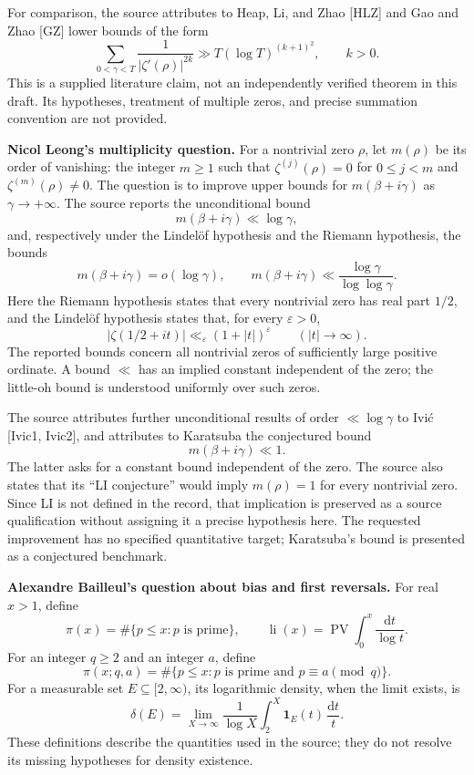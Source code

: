 \documentclass[11pt]{article}
\begin{document}
For comparison, the source attributes to Heap, Li, and Zhao [HLZ] and Gao and Zhao [GZ] lower bounds of the form
\[
\sum_{0<\gamma<T}\frac{1}{|\zeta'(\rho)|^{2k}}
\gg T(\log T)^{(k+1)^2},\qquad k>0.
\]
This is a supplied literature claim, not an independently verified theorem in this draft. Its hypotheses, treatment of multiple zeros, and precise summation convention are not provided.

\textbf{Nicol Leong's multiplicity question.}
For a nontrivial zero \(\rho\), let \(m(\rho)\) be its order of vanishing: the integer \(m\geq1\) such that \(\zeta^{(j)}(\rho)=0\) for \(0\leq j<m\) and \(\zeta^{(m)}(\rho)\neq0\). The question is to improve upper bounds for \(m(\beta+i\gamma)\) as \(\gamma\to+\infty\). The source reports the unconditional bound
\[
m(\beta+i\gamma)\ll\log\gamma,
\]
and, respectively under the Lindel\"of hypothesis and the Riemann hypothesis, the bounds
\[
m(\beta+i\gamma)=o(\log\gamma),
\qquad
m(\beta+i\gamma)\ll\frac{\log\gamma}{\log\log\gamma}.
\]
Here the Riemann hypothesis states that every nontrivial zero has real part \(1/2\), and the Lindel\"of hypothesis states that, for every \(\varepsilon>0\),
\[
|\zeta(1/2+it)|\ll_{\varepsilon}(1+|t|)^{\varepsilon}
\qquad(|t|\to\infty).
\]
The reported bounds concern all nontrivial zeros of sufficiently large positive ordinate. A bound \(\ll\) has an implied constant independent of the zero; the little-oh bound is understood uniformly over such zeros.

The source attributes further unconditional results of order \(\ll\log\gamma\) to Ivi\'c [Ivic1, Ivic2], and attributes to Karatsuba the conjectured bound
\[
m(\beta+i\gamma)\ll1.
\]
The latter asks for a constant bound independent of the zero. The source also states that its ``LI conjecture'' would imply \(m(\rho)=1\) for every nontrivial zero. Since LI is not defined in the record, that implication is preserved as a source qualification without assigning it a precise hypothesis here. The requested improvement has no specified quantitative target; Karatsuba's bound is presented as a conjectured benchmark.

\textbf{Alexandre Bailleul's question about bias and first reversals.}
For real \(x>1\), define
\[
\pi(x)=\#\{p\leq x:p\text{ is prime}\},
\qquad
\operatorname{li}(x)=\operatorname{PV}\int_0^x\frac{\mathrm{d}t}{\log t}.
\]
For an integer \(q\geq2\) and an integer \(a\), define
\[
\pi(x;q,a)=\#\{p\leq x:p\text{ is prime and }p\equiv a\pmod q\}.
\]
For a measurable set \(E\subseteq[2,\infty)\), its logarithmic density, when the limit exists, is
\[
\delta(E)=\lim_{X\to\infty}\frac{1}{\log X}
\int_2^X\mathbf{1}_E(t)\,\frac{\mathrm{d}t}{t}.
\]
These definitions describe the quantities used in the source; they do not resolve its missing hypotheses for density existence.
\end{document}
